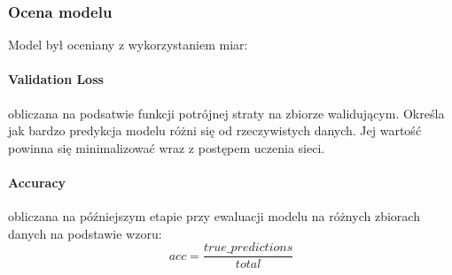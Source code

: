\subsubsection{Ocena modelu}
Model był oceniany z wykorzystaniem miar:
\paragraph{Validation Loss} obliczana na podsatwie funkcji potrójnej straty na zbiorze walidującym. Określa jak bardzo predykcja modelu różni się od rzeczywistych danych. Jej wartość powinna się minimalizować wraz z postępem uczenia sieci.


\paragraph{Accuracy} obliczana na późniejszym etapie przy ewaluacji modelu na różnych zbiorach danych na podstawie wzoru:
$$ acc = \frac{true\_predictions}{total} $$ 



